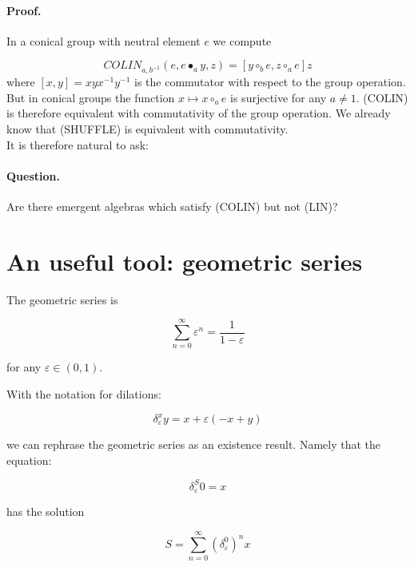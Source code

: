 \documentclass{article}
\begin{document}
\paragraph{Proof.} In a conical group with neutral element $e$ we compute 

$$COLIN_{a,b^{-1}}(e,e \bullet_{a} y,z) = [y \circ_{b} e, z \circ_{a} e] z$$ 
where $\displaystyle [x,y] = x y x^{-1} y^{-1}$ is the commutator with respect to the group operation. But in conical groups the function $\displaystyle x \mapsto x \circ_{a} e$ is surjective for any $a \not = 1$. (COLIN) is therefore equivalent with commutativity of the group operation. We already know that (SHUFFLE) is equivalent with commutativity. \\ 




It is therefore natural to ask: 

\paragraph{Question.} Are there emergent algebras which satisfy (COLIN) but not (LIN)? \\ 


\section{An useful tool: geometric series}


The geometric series is



$$ \sum_{n=0}^{\infty} \varepsilon^{n}  = \frac{1}{1-\varepsilon}$$



for any $\varepsilon \in (0,1)$. 



With the notation for dilations: 



$$ \delta^{x}_{\varepsilon} y = x + \varepsilon (-x+y)$$



we can rephrase the geometric series as an existence result. Namely that the equation: 



$$ \delta^{S}_{\varepsilon} 0 = x $$



has the solution 



$$ S = \sum_{n=0}^{\infty} \left( \delta^{0}_{\varepsilon}\right)^{n} x$$
\end{document}
